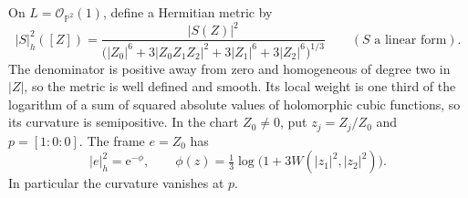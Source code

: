 On $L=\mathcal O_{\mathbb P^2}(1)$, define a Hermitian metric by
\[
 |S|_h^2([Z])=
 \frac{|S(Z)|^2}
 {\bigl(|Z_0|^6+3|Z_0Z_1Z_2|^2+3|Z_1|^6+3|Z_2|^6\bigr)^{1/3}}
 \qquad(S\text{ a linear form}).
\]
The denominator is positive away from zero and homogeneous of degree two in $|Z|$, so the metric is well defined and smooth. Its local weight is one third of the logarithm of a sum of squared absolute values of holomorphic cubic functions, so its curvature is semipositive. In the chart $Z_0\ne0$, put $z_j=Z_j/Z_0$ and $p=[1:0:0]$. The frame $e=Z_0$ has
\begin{equation}\label{eq:logarithmic-projective-weight}
 |e|_h^2=\mathrm e^{-\phi},\qquad
 \phi(z)=\tfrac13\log\bigl(1+3W(|z_1|^2,|z_2|^2)\bigr).
\end{equation}
In particular the curvature vanishes at $p$.

